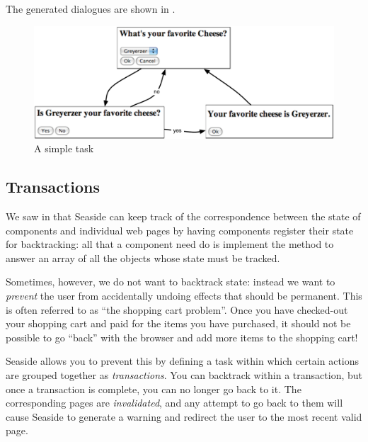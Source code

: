 \documentclass[a4paper,10pt,twoside]{book}
\begin{document}
{{The generated dialogues are shown in .

\begin{figure}[ht]
\begin{center}
\includegraphics[width=\textwidth]{chooseCheese}
\caption{A simple task}
\end{center}
\end{figure}

\subsection{Transactions}

We saw in  that Seaside can keep track of the correspondence between the state of components and individual web pages by having components register their state for backtracking:
all that a component need do is implement the method  to answer an array of all the objects whose state must be tracked.

Sometimes, however, we do not want to backtrack state: instead we want to \emph{prevent} the user from accidentally undoing effects that should be permanent.
This is often referred to as ``the shopping cart problem''.
Once you have checked-out your shopping cart and paid for the items you have purchased, it should not be possible to go ``back'' with the browser and add more items to the shopping cart!

Seaside allows you to prevent this by defining a task within which certain actions are grouped together as \emph{transactions}.
You can backtrack within a transaction, but once a transaction is complete, you can no longer go back to it.
The corresponding pages are \emph{invalidated}, and any attempt to go back to them will cause Seaside to generate a warning and redirect the user to the most recent valid page.

}}
\end{document}
